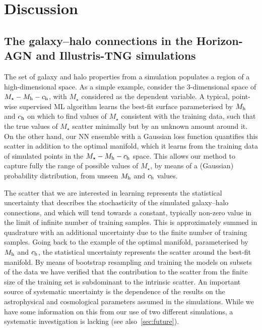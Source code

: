 \documentclass[usenatbib,useAMS]{mnras}
\newcommand{\rs}[1]{\textcolor{magenta}{[{\bf RS says}: #1]}}
\newcommand{\hd}[1]{\textcolor{purple}{[{\bf HD says}: #1]}}
\begin{document}
\section{Discussion}
\label{sec:Discussion}

\subsection{The galaxy--halo connections in the Horizon-AGN and Illustris-TNG simulations}\label{sec:sim_comp}

The set of galaxy and halo properties from a simulation populates a region of a high-dimensional space. As a simple example, consider the 3-dimensional space of $M_\star - M_{\rm h} - c_{\rm h}$, with $M_\star$ considered as the dependent variable. A typical, point-wise supervised ML algorithm learns the best-fit surface parameterised by $M_{\rm h}$ and $c_{\rm h}$ on which to find values of $M_\star$ consistent with the training data, such that the true values of $M_\star$ scatter minimally but by an unknown amount around it. On the other hand, our NN ensemble with a Gaussian loss function quantifies this scatter in addition to the optimal manifold, which it learns from the training data of simulated points in the $M_\star - M_{\rm h} - c_{\rm h}$ space. This allows our method to capture fully the range of possible values of $M_\star$, by means of a (Gaussian) probability distribution, from unseen $M_{\rm h}$ and $c_{\rm h}$ values.

The scatter that we are interested in learning represents the statistical uncertainty that describes the stochasticity of the simulated galaxy--halo connections, and which will tend towards a constant, typically non-zero value in the limit of infinite number of training samples. This is approximately summed in quadrature with an additional uncertainty due to the finite number of training samples. Going back to the example of the optimal manifold, parameterised by $M_{\rm h}$ and $c_{\rm h}$, the statistical uncertainty represents the scatter around the best-fit manifold.
By means of bootstrap resampling and training the models on subsets of the data we have verified that the contribution to the scatter from the finite size of the training set is subdominant to the intrinsic scatter. An important source of systematic uncertainty is the dependence of the results on the astrophysical and cosmological parameters assumed in the simulations. While we have some information on this from our use of two different simulations, a systematic investigation is lacking (see also~\cref{sec:future}).
\end{document}
